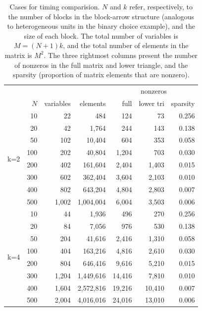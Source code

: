 \documentclass[codesnippet,nojss]{jss}\usepackage[]{graphicx}\usepackage[]{color}
\begin{document}
\begin{table}\centering
  \begin{tabular}{rrrrrrr}
    \toprule
    &&&&\multicolumn{3}{c}{nonzeros}\\
    \cmidrule(lr){5-7}
    &$N$&variables&elements&full&lower tri&sparsity\\
    \midrule
 \multirow{8}{*}{k=2} & 10 & 22 & 484 & 124 & 73 & 0.256 \\
   & 20 & 42 & 1,764 & 244 & 143 & 0.138 \\
   & 50 & 102 & 10,404 & 604 & 353 & 0.058 \\
   & 100 & 202 & 40,804 & 1,204 & 703 & 0.030 \\
   & 200 & 402 & 161,604 & 2,404 & 1,403 & 0.015 \\
   & 300 & 602 & 362,404 & 3,604 & 2,103 & 0.010 \\
   & 400 & 802 & 643,204 & 4,804 & 2,803 & 0.007 \\
   & 500 & 1,002 & 1,004,004 & 6,004 & 3,503 & 0.006 \\
   \midrule
\multirow{8}{*}{k=4} & 10 & 44 & 1,936 & 496 & 270 & 0.256 \\
   & 20 & 84 & 7,056 & 976 & 530 & 0.138 \\
   & 50 & 204 & 41,616 & 2,416 & 1,310 & 0.058 \\
   & 100 & 404 & 163,216 & 4,816 & 2,610 & 0.030 \\
   & 200 & 804 & 646,416 & 9,616 & 5,210 & 0.015 \\
   & 300 & 1,204 & 1,449,616 & 14,416 & 7,810 & 0.010 \\
   & 400 & 1,604 & 2,572,816 & 19,216 & 10,410 & 0.007 \\
   & 500 & 2,004 & 4,016,016 & 24,016 & 13,010 & 0.006 \\

\bottomrule
\end{tabular}
\caption{Cases for timing comparision. $N$ and $k$ refer,
  respectively, to the number of blocks in
  the block-arrow structure (analogous to heterogeneous units in the
  binary choice example), and the size of each block.  The total
  number of variables is $M=(N+1)k$, and the total number of elements
  in the matrix is $M^2$. The three rightmost columns present the
  number of nonzeros in the full matrix and lower triangle, and the
  sparsity (proportion of matrix elements that are nonzero).}\label{tab:cases}
\end{table}
\end{document}
